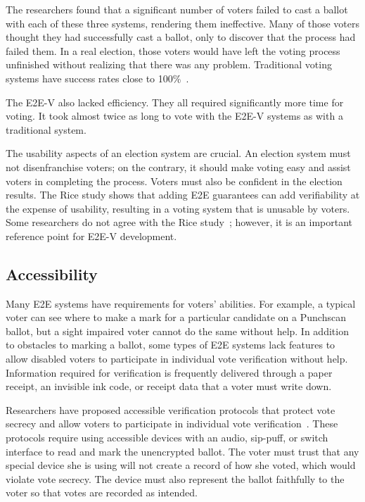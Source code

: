 The researchers found that a significant number of voters failed to
cast a ballot with each of these three systems, rendering them
ineffective. Many of those voters thought they had successfully cast a
ballot, only to discover that the process had failed them. In a real
election, those voters would have left the voting process unfinished
without realizing that there was any problem. Traditional voting
systems have success rates close to 100\%~\cite{byrne2007usability}.

The E2E-V also lacked efficiency. They all required significantly more
time for voting. It took almost twice as long to vote with the E2E-V
systems as with a traditional system.

The usability aspects of an election system are crucial. An election
system must not disenfranchise voters; on the contrary, it should
make voting easy and assist voters in completing the process. Voters
must also be confident in the election results. The Rice study
shows that adding E2E guarantees can add verifiability at the expense
of usability, resulting in a voting system that is unusable by
voters. Some researchers do not agree with the Rice
study~\cite{mcburnett2014}; however, it is an important reference
point for E2E-V development. 

\subsection{Accessibility}

Many E2E systems have requirements for voters' abilities. For example,
a typical voter can see where to make a mark for a particular
candidate on a Punchscan ballot, but a sight impaired voter cannot do
the same without help. In addition to obstacles to marking a ballot,
some types of E2E systems lack features to allow disabled voters to
participate in individual vote verification without help. Information
required for verification is frequently delivered through a paper
receipt, an invisible ink code, or receipt data that a voter must
write down.

Researchers have proposed accessible verification protocols that
protect vote secrecy and allow voters to participate in individual
vote verification~\cite{chaum2009accessible}. These protocols require
using accessible devices with an audio, sip-puff, or switch interface
to read and mark the unencrypted ballot. The voter must trust that any
special device she is using will not create a record of how she voted,
which would violate vote secrecy. The device must also represent the
ballot faithfully to the voter so that votes are recorded as intended.

